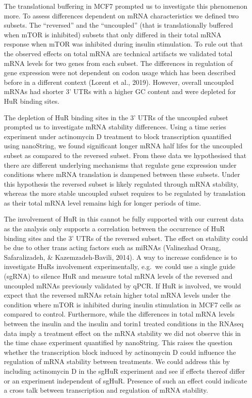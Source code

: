 \documentclass[12pt,openany]{book}
\begin{document}
The translational buffering in MCF7 prompted us to investigate this
phenomenon more. To assess differences dependent on mRNA characteristics
we defined two subsets. The ``reversed'' and the ``uncoupled'' (that is
translationally buffered when mTOR is inhibited) subsets that only
differed in their total mRNA response when mTOR was inhibited during
insulin stimulation. To rule out that the observed effects on total mRNA
are technical artifacts we validated total mRNA levels for two genes
from each subset. The differences in regulation of gene expression were
not dependent on codon usage which has been described before in a
different context (Lorent et al., 2019). However, overall uncoupled
mRNAs had shorter 3' UTRs with a higher GC content and were depleted for
HuR binding sites.

The depletion of HuR binding sites in the 3' UTRs of the uncoupled
subset prompted us to investigate mRNA stability differences. Using a
time series experiment under actinomycin D treatment to block
transcription quantified using nanoString, we found significant longer
mRNA half lifes for the uncoupled subset as compared to the reversed
subset. From these data we hypothesised that there are different
underlying mechanisms that regulate gene expression under conditions
where mRNA translation is dampened between these subsets. Under this
hypothesis the reversed subset is likely regulated through mRNA
stability, whereas the more stable uncoupled subset requires to be
regulated by translation as their total mRNA level remains high for
longer periods of time.

The involvement of HuR in this cannot be fully supported with our
current data as the analysis only supports a correlation between the
occurrence of HuR binding sites and the 3' UTRs of the reversed subset.
The effect on stability could be due to other trans acting factors such
as miRNAs (Valinezhad Orang, Safaralizadeh, \& Kazemzadeh-Bavili, 2014).
A way to increase confidence is to investigate HuRs involvement
experimentally, e.g.~we could use a single guide (sgRNA) to silence HuR
and measure total mRNA levels of the reversed and uncoupled mRNAs
previously validated by qPCR. If HuR is involved, we would expect that
the reversed mRNAs retain higher total mRNA levels under the condition
where mTOR is inhibited during insulin stimulation in MCF7 cells as
compared to control. Furthermore, while the differences in total mRNA
levels between the insulin and the insulin and torin1 treated conditions
in the RNAseq data imply a treatment effect on the mRNA stability we did
not observe this in the time chase experiment quantified by nanoString.
This raises the question whether the transcription block induced by
actinomycin D could influence the regulation of mRNA stability between
treatments. We could address this by including actinomycin D in the
sgHuR experiment and see if effects thereof differ or an experiment
independent of sgHuR. Presence of such an effect could indicate a cross
talk between transcription and regulation of mRNA stability.
\end{document}
